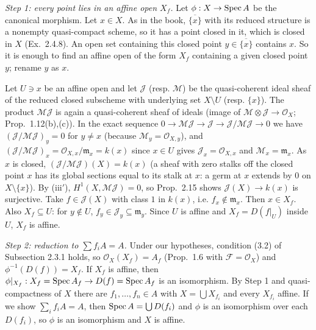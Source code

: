 \documentclass[11pt]{article}
\begin{document}
\emph{Step 1: every point lies in an affine open $X_f$.} Let $\phi:X\to\operatorname{Spec} A$ be the canonical morphism. Let $x\in X$. As in the book, $\overline{\{x\}}$ with its reduced structure is a nonempty quasi-compact scheme, so it has a point closed in it, which is closed in $X$ (Ex.~2.4.8). An open set containing this closed point $y\in\overline{\{x\}}$ contains $x$. So it is enough to find an affine open of the form $X_f$ containing a given closed point $y$; rename $y$ as $x$.

Let $U\ni x$ be an affine open and let $\mathcal J$ (resp. $\mathcal M$) be the quasi-coherent ideal sheaf of the reduced closed subscheme with underlying set $X\setminus U$ (resp. $\{x\}$). The product $\mathcal M\mathcal J$ is again a quasi-coherent sheaf of ideals (image of $\mathcal M\otimes\mathcal J\to\mathcal O_X$; Prop.~1.12(b),(c)). In the exact sequence $0\to\mathcal M\mathcal J\to\mathcal J\to\mathcal J/\mathcal M\mathcal J\to0$ we have $(\mathcal J/\mathcal M\mathcal J)_y=0$ for $y\ne x$ (because $\mathcal M_y=\mathcal O_{X,y}$), and $(\mathcal J/\mathcal M\mathcal J)_x=\mathcal O_{X,x}/\mathfrak m_x=k(x)$ since $x\in U$ gives $\mathcal J_x=\mathcal O_{X,x}$ and $\mathcal M_x=\mathfrak m_x$. As $x$ is closed, $(\mathcal J/\mathcal M\mathcal J)(X)=k(x)$ (a sheaf with zero stalks off the closed point $x$ has its global sections equal to its stalk at $x$: a germ at $x$ extends by $0$ on $X\setminus\{x\}$). By (iii$'$), $H^1(X,\mathcal M\mathcal J)=0$, so Prop.~2.15 shows $\mathcal J(X)\to k(x)$ is surjective. Take $f\in\mathcal J(X)$ with class $1$ in $k(x)$, i.e. $f_x\notin\mathfrak m_x$. Then $x\in X_f$. Also $X_f\subseteq U$: for $y\notin U$, $f_y\in\mathcal J_y\subseteq\mathfrak m_y$. Since $U$ is affine and $X_f=D(f|_U)$ inside $U$, $X_f$ is affine.

\emph{Step 2: reduction to $\sum f_iA=A$.} Under our hypotheses, condition (3.2) of Subsection 2.3.1 holds, so $\mathcal O_X(X_f)=A_f$ (Prop.~1.6 with $\mathcal F=\mathcal O_X$) and $\phi^{-1}(D(f))=X_f$. If $X_f$ is affine, then $\phi|_{X_f}:X_f=\operatorname{Spec} A_f\to D(f)=\operatorname{Spec} A_f$ is an isomorphism. By Step 1 and quasi-compactness of $X$ there are $f_1,\dots,f_n\in A$ with $X=\bigcup X_{f_i}$ and every $X_{f_i}$ affine. If we show $\sum_if_iA=A$, then $\operatorname{Spec} A=\bigcup D(f_i)$ and $\phi$ is an isomorphism over each $D(f_i)$, so $\phi$ is an isomorphism and $X$ is affine.
\end{document}
